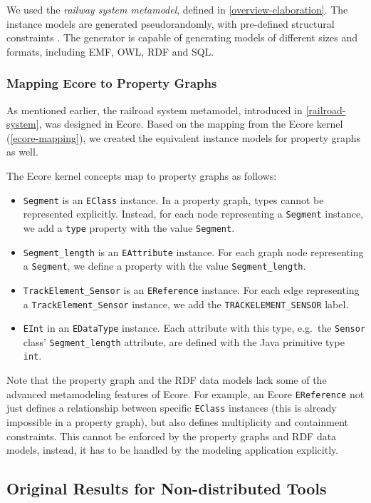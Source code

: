 We used  the \emph{railway system metamodel}, defined in \autoref{overview-elaboration}. The instance models are generated pseudorandomly, with pre-defined structural constraints \cite{ASE2013}. The generator is capable of generating models of different sizes and formats, including EMF, OWL, RDF and SQL. 

\subsubsection{Mapping Ecore to Property Graphs}

As mentioned earlier, the railroad system metamodel, introduced in \autoref{railroad-system}, was designed in Ecore. Based on the mapping from the Ecore kernel (\autoref{ecore-mapping}), we created the equivalent instance models for property graphs as well.

The Ecore kernel concepts map to property graphs as follows:
\begin{itemize}
  \item \verb+Segment+ is an \verb+EClass+ instance. In a property graph, types cannot be represented explicitly. Instead, for each node representing a \verb+Segment+ instance, we add a \verb+type+ property with the value \verb+Segment+.
  \item \verb+Segment_length+ is an \verb+EAttribute+ instance. For each graph node representing a \verb+Segment+, we define a property with the value \verb+Segment_length+.
  \item \verb+TrackElement_Sensor+ is an \verb+EReference+ instance. For each edge representing a \verb+TrackElement_Sensor+ instance, we add the \verb+TRACKELEMENT_SENSOR+ label.
  \item \verb+EInt+ in an \verb+EDataType+ instance. Each attribute with this type, e.g.\ the \verb+Sensor+ class' \verb+Segment_length+ attribute, are defined with the Java primitive type \verb+int+.
\end{itemize}
Note that the property graph and the RDF data models lack some of the advanced metamodeling features of Ecore. For example, an Ecore \verb+EReference+ not just defines a relationship between specific \verb+EClass+ instances (this is already impossible in a property graph), but also defines multiplicity and containment constraints. This cannot be enforced by the property graphs and RDF data models, instead, it has to be handled by the modeling application explicitly. 

\subsection{Original Results for Non-distributed Tools}


